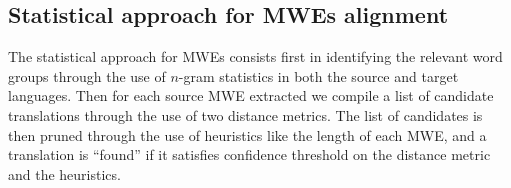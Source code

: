 \documentclass[output=paper,modfonts,nonflat]{langsci/langscibook}
\begin{document}
\subsection{Statistical approach for MWEs alignment}\label{sec:semmar:4.1}

The statistical approach for MWEs  consists first in identifying the relevant word groups through the use of $n$-gram statistics in both the source and target languages. 
Then for each source MWE extracted we compile a list of candidate translations through the use of two distance metrics. 
The list of candidates is then pruned through the use of heuristics like the length of each MWE, and a translation is ``found'' if it satisfies confidence threshold on the distance metric and the heuristics.
\end{document}
